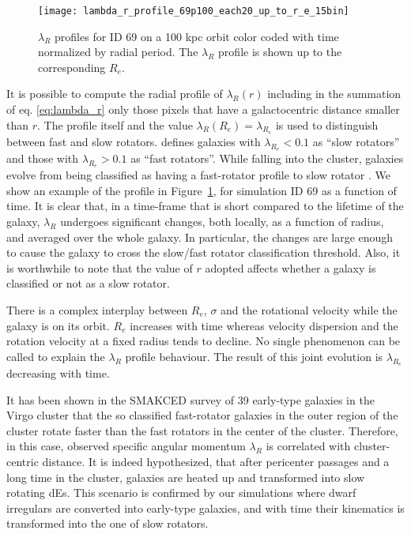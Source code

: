 \begin{figure}[h!]
\centering
\texttt{[image: lambda\_r\_profile\_69p100\_each20\_up\_to\_r\_e\_15bin]}
\caption{$\lambda_R$ profiles for ID 69 on a 100 kpc orbit color coded with time normalized by radial period.
The $\lambda_R$ profile is shown up to the corresponding $R_e$.}
\label{fig:lambda_r_profile}
\end{figure}

It is possible to compute the radial profile of $\lambda_R(r)$ including in the summation of eq. \eqref{eq:lambda_r} only those pixels that have a galactocentric distance smaller than $r$.
The profile itself and the value $\lambda_R(R_e) = \lambda_{R_e}$ is used to distinguish between fast and slow rotators.
\citet{Emsellem2007} defines galaxies with $\lambda_{R_e} < 0.1$ as ``slow rotators'' and those with $\lambda_{R_e}>0.1$ as ``fast rotators''. While falling into the cluster, galaxies evolve from being classified as having a fast-rotator profile to slow rotator \citep[\cf{} also][]{Emsellem2011}.
We show an example of the profile in Figure~\ref{fig:lambda_r_profile}, for simulation ID 69 as a function of time.
It is clear that, in a time-frame that is short compared to the lifetime of the galaxy, $\lambda_R$ undergoes significant changes, both locally, as a function of radius, and averaged over the whole galaxy.
In particular, the changes are large enough to cause the galaxy to cross the slow/fast rotator classification threshold.
Also, it is worthwhile to note that the value of $r$ adopted affects whether a galaxy is classified or not as a slow rotator.

There is a complex interplay between $R_e$, $\sigma$ and the rotational velocity while the galaxy is on its orbit.
$R_e$ increases with time whereas velocity dispersion and the rotation velocity at a fixed radius tends to decline.
No single phenomenon can be called to explain the $\lambda_R$ profile behaviour.
The result of this joint evolution is $\lambda_{R_e}$ decreasing with time.


It has been shown in the \textsc{SMAKCED} survey of 39 early-type galaxies in the Virgo cluster \citep{Toloba2014, Toloba2015} that the so classified fast-rotator galaxies in the outer region of the cluster rotate faster than the fast rotators in the center of the cluster.
Therefore, in this case, observed specific angular momentum $\lambda_R$ is correlated with cluster-centric distance. %
It is indeed hypothesized, that after pericenter passages and a long time in the cluster, galaxies are heated up and transformed into slow rotating dEs.
This scenario is confirmed by our simulations where dwarf irregulars are converted into early-type galaxies, and with time their kinematics is transformed into the one of slow rotators.

